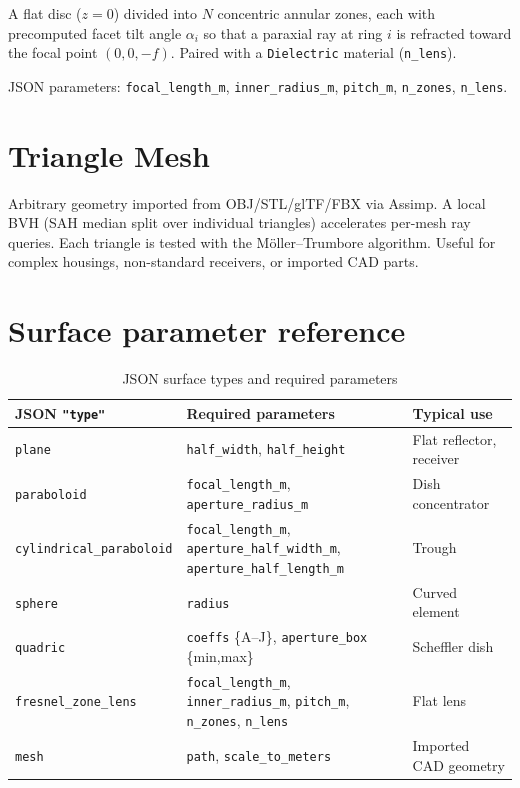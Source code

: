 \documentclass[12pt,a4paper]{report}
\begin{document}
A flat disc ($z=0$) divided into $N$ concentric annular zones, each with precomputed facet
tilt angle $\alpha_i$ so that a paraxial ray at ring $i$ is refracted toward the focal point
$(0,0,-f)$.  Paired with a \texttt{Dielectric} material (\texttt{n\_lens}).

JSON parameters: \texttt{focal\_length\_m}, \texttt{inner\_radius\_m}, \texttt{pitch\_m},
\texttt{n\_zones}, \texttt{n\_lens}.

\section{Triangle Mesh}

Arbitrary geometry imported from OBJ/STL/glTF/FBX via Assimp.  A local BVH (SAH median
split over individual triangles) accelerates per-mesh ray queries.  Each triangle is tested
with the Möller--Trumbore algorithm.  Useful for complex housings, non-standard receivers,
or imported CAD parts.

\section{Surface parameter reference}

\begin{table}[H]\centering
\caption{JSON surface types and required parameters}
\begin{tabular}{lll}
\toprule
JSON \texttt{"type"} & Required parameters & Typical use \\
\midrule
\texttt{plane}                  & \texttt{half\_width}, \texttt{half\_height} & Flat reflector, receiver \\
\texttt{paraboloid}             & \texttt{focal\_length\_m}, \texttt{aperture\_radius\_m} & Dish concentrator \\
\texttt{cylindrical\_paraboloid}& \texttt{focal\_length\_m}, \texttt{aperture\_half\_width\_m},
                                  \texttt{aperture\_half\_length\_m} & Trough \\
\texttt{sphere}                 & \texttt{radius} & Curved element \\
\texttt{quadric}                & \texttt{coeffs} \{A--J\}, \texttt{aperture\_box} \{min,max\} & Scheffler dish \\
\texttt{fresnel\_zone\_lens}    & \texttt{focal\_length\_m}, \texttt{inner\_radius\_m},
                                  \texttt{pitch\_m}, \texttt{n\_zones}, \texttt{n\_lens} & Flat lens \\
\texttt{mesh}                   & \texttt{path}, \texttt{scale\_to\_meters} & Imported CAD geometry \\
\bottomrule
\end{tabular}
\end{table}
\end{document}
